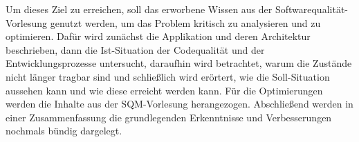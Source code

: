 Um dieses Ziel zu erreichen, soll das erworbene Wissen aus der Softwarequalität-Vorlesung genutzt werden, 
um das Problem kritisch zu analysieren und zu optimieren. 
Dafür wird zunächst die Applikation und deren Architektur beschrieben, 
dann die Ist-Situation der Codequalität und der Entwicklungsprozesse untersucht, 
daraufhin wird betrachtet, warum die Zustände nicht länger tragbar sind und schließlich wird erörtert, wie 
die Soll-Situation aussehen kann und wie diese erreicht werden kann. 
Für die Optimierungen werden die Inhalte aus der SQM-Vorlesung herangezogen. 
Abschließend werden in einer Zusammenfassung die grundlegenden Erkenntnisse und Verbesserungen nochmals bündig dargelegt.




